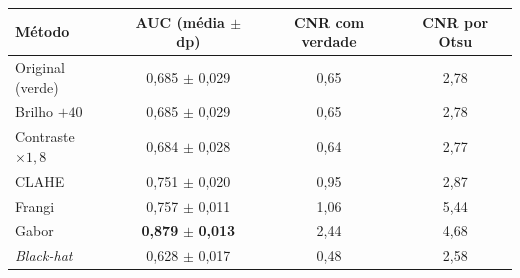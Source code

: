 \begin{tabular}{lccc}
\toprule
Método & AUC (média $\pm$ dp) & CNR com verdade & CNR por Otsu \\
\midrule
Original (verde) & 0,685 $\pm$ 0,029 & 0,65 & 2,78 \\
Brilho $+40$ & 0,685 $\pm$ 0,029 & 0,65 & 2,78 \\
Contraste $\times1{,}8$ & 0,684 $\pm$ 0,028 & 0,64 & 2,77 \\
CLAHE & 0,751 $\pm$ 0,020 & 0,95 & 2,87 \\
\midrule
Frangi & 0,757 $\pm$ 0,011 & 1,06 & 5,44 \\
Gabor & \textbf{0,879} $\pm$ \textbf{0,013} & 2,44 & 4,68 \\
\textit{Black-hat} & 0,628 $\pm$ 0,017 & 0,48 & 2,58 \\
\bottomrule
\end{tabular}
